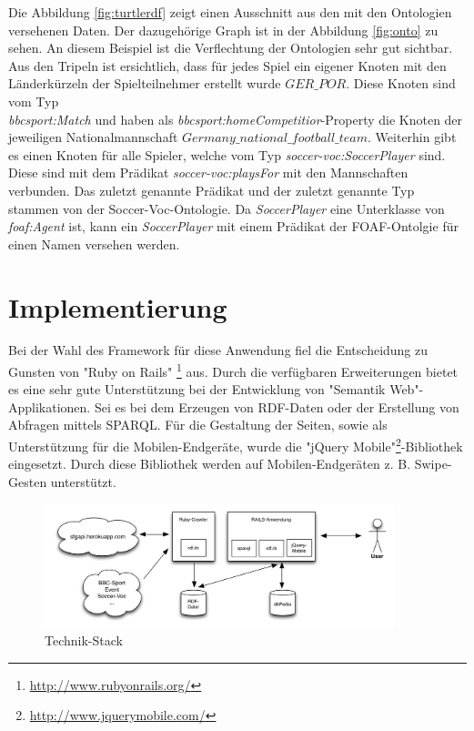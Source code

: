 \documentclass[runningheads,a4paper]{llncs}
\begin{document}
Die Abbildung \ref{fig:turtlerdf} zeigt einen Ausschnitt aus den mit den Ontologien versehenen Daten. Der dazugehörige Graph ist in der Abbildung \ref{fig:onto} zu sehen. An diesem Beispiel ist die Verflechtung der Ontologien sehr gut sichtbar.
Aus den Tripeln ist ersichtlich, dass für jedes Spiel ein eigener Knoten mit den Länderkürzeln der Spielteilnehmer erstellt wurde \(GER\_POR\). Diese Knoten sind vom Typ \\\textit{bbcsport:Match} und haben als \textit{bbcsport:homeCompetitior}-Property die Knoten der jeweiligen Nationalmannschaft \(Germany\_national\_football\_team\). 
Weiterhin gibt es einen Knoten für alle Spieler, welche vom Typ \textit{soccer-voc:SoccerPlayer} sind. Diese sind mit dem Prädikat \textit{soccer-voc:playsFor} mit den Mannschaften verbunden. Das zuletzt genannte Prädikat und der zuletzt genannte Typ stammen von der Soccer-Voc-Ontologie. Da \textit{SoccerPlayer} eine Unterklasse von \textit{foaf:Agent} ist, kann ein \textit{SoccerPlayer} mit einem Prädikat der FOAF-Ontolgie für einen Namen versehen werden.


\section{Implementierung}


Bei der Wahl des Framework für diese Anwendung fiel die Entscheidung zu Gunsten von "Ruby on Rails" \footnote{\url{http://www.rubyonrails.org/}} aus. Durch die verfügbaren Erweiterungen bietet es eine sehr gute Unterstützung bei der Entwicklung von "{}Semantik Web"{}-Applikationen. Sei es bei dem Erzeugen von RDF-Daten oder der Erstellung von Abfragen mittels SPARQL. Für die Gestaltung der Seiten, sowie als Unterstützung für die Mobilen-Endgeräte, wurde die "jQuery Mobile"\footnote{\url{http://www.jquerymobile.com/}}-Bibliothek eingesetzt. Durch diese Bibliothek werden auf Mobilen-Endgeräten z. B. Swipe-Gesten unterstützt. 

\begin{figure}
\centering
\includegraphics[height=3.6cm]{technik-stack}
\caption{Technik-Stack}
\label{fig:example}
\end{figure}
\end{document}
